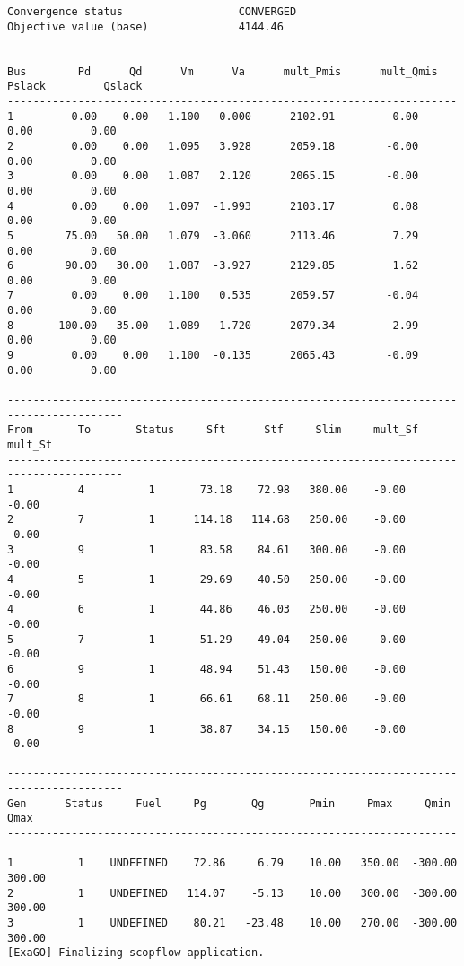 \begin{lstlisting}
Convergence status                  CONVERGED
Objective value (base)              4144.46

----------------------------------------------------------------------
Bus        Pd      Qd      Vm      Va      mult_Pmis      mult_Qmis      Pslack         Qslack        
----------------------------------------------------------------------
1         0.00    0.00   1.100   0.000      2102.91         0.00         0.00         0.00
2         0.00    0.00   1.095   3.928      2059.18        -0.00         0.00         0.00
3         0.00    0.00   1.087   2.120      2065.15        -0.00         0.00         0.00
4         0.00    0.00   1.097  -1.993      2103.17         0.08         0.00         0.00
5        75.00   50.00   1.079  -3.060      2113.46         7.29         0.00         0.00
6        90.00   30.00   1.087  -3.927      2129.85         1.62         0.00         0.00
7         0.00    0.00   1.100   0.535      2059.57        -0.04         0.00         0.00
8       100.00   35.00   1.089  -1.720      2079.34         2.99         0.00         0.00
9         0.00    0.00   1.100  -0.135      2065.43        -0.09         0.00         0.00

----------------------------------------------------------------------------------------
From       To       Status     Sft      Stf     Slim     mult_Sf  mult_St 
----------------------------------------------------------------------------------------
1          4          1       73.18    72.98   380.00    -0.00    -0.00
2          7          1      114.18   114.68   250.00    -0.00    -0.00
3          9          1       83.58    84.61   300.00    -0.00    -0.00
4          5          1       29.69    40.50   250.00    -0.00    -0.00
4          6          1       44.86    46.03   250.00    -0.00    -0.00
5          7          1       51.29    49.04   250.00    -0.00    -0.00
6          9          1       48.94    51.43   150.00    -0.00    -0.00
7          8          1       66.61    68.11   250.00    -0.00    -0.00
8          9          1       38.87    34.15   150.00    -0.00    -0.00

----------------------------------------------------------------------------------------
Gen      Status     Fuel     Pg       Qg       Pmin     Pmax     Qmin     Qmax  
----------------------------------------------------------------------------------------
1          1    UNDEFINED    72.86     6.79    10.00   350.00  -300.00   300.00
2          1    UNDEFINED   114.07    -5.13    10.00   300.00  -300.00   300.00
3          1    UNDEFINED    80.21   -23.48    10.00   270.00  -300.00   300.00
[ExaGO] Finalizing scopflow application.
\end{lstlisting}
